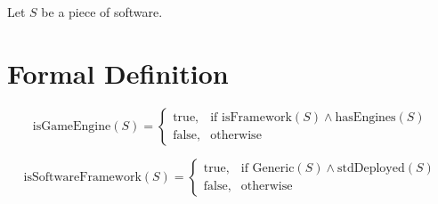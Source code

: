



\pagebreak







Let \( S \) be a piece of software.

\section*{Formal Definition}

\[
\text{isGameEngine}(S) =
\begin{cases}
    \text{true}, & \text{if } \text{isFramework}(S) \land \text{hasEngines}(S) \\
    \text{false}, & \text{otherwise}
\end{cases}
\]











\[
\text{isSoftwareFramework}(S) =
\begin{cases}
    \text{true}, & \text{if } \text{Generic}(S)  \land \text{stdDeployed}(S) \\
    \text{false}, & \text{otherwise}
\end{cases}
\]














